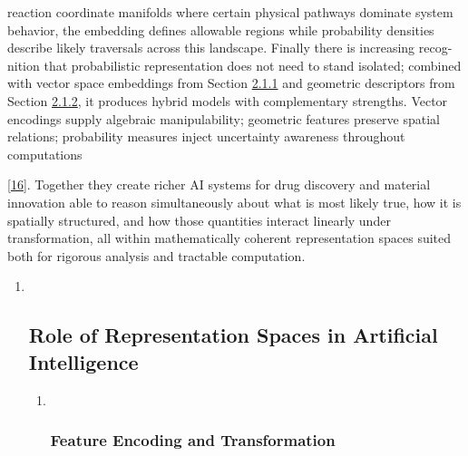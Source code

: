 \documentclass[
]{article}
\begin{document}
reaction coordinate manifolds where certain physical pathways dominate
system behavior, the embedding defines allowable regions while
probability densities describe likely traversals across this landscape.
Finally there is increasing recog- nition that probabilistic
representation does not need to stand isolated; combined with vector
space embeddings from Section
\protect\hyperlink{vector-spaces-and-linear-algebra}{2.1.1} and
geometric descriptors from Section
\protect\hyperlink{geometric-and-spatial-models}{2.1.2}, it produces
hybrid models with complementary strengths. Vector encodings supply
algebraic manipulability; geometric features preserve spatial relations;
probability measures inject uncertainty awareness throughout
computations

{[}\protect\hyperlink{_bookmark56}{16}{]}. Together they create richer
AI systems for drug discovery and material innovation able to reason
simultaneously about what is most likely true, how it is spatially
structured, and how those quantities interact linearly under
transformation, all within mathematically coherent representation spaces
suited both for rigorous analysis and tractable computation.

\begin{enumerate}
\def\labelenumi{\arabic{enumi}.}
\setcounter{enumi}{1}
\item ~
  \hypertarget{role-of-representation-spaces-in-artificial-intelligence}{%
  \subsection{Role of Representation Spaces in Artificial
  Intelligence}\label{role-of-representation-spaces-in-artificial-intelligence}}

  \begin{enumerate}
  \def\labelenumii{\arabic{enumii}.}
  \item ~
    \hypertarget{feature-encoding-and-transformation}{%
    \subsubsection{Feature Encoding and
    Transformation}\label{feature-encoding-and-transformation}}
  \end{enumerate}
\end{enumerate}
\end{document}
